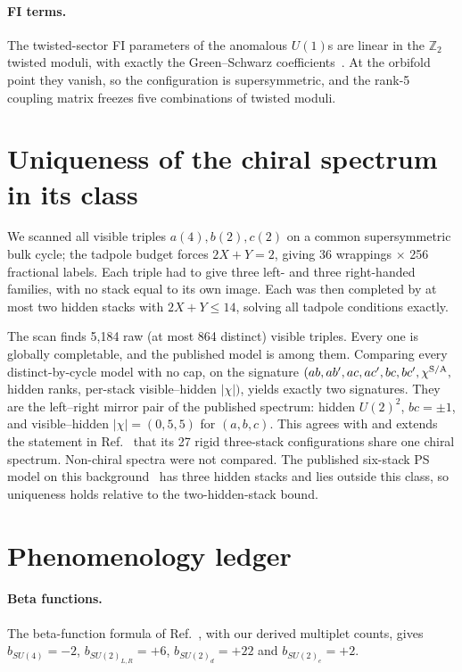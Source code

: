 \documentclass[aps,prd,twocolumn,superscriptaddress,nofootinbib,showkeys]{revtex4-2}
\begin{document}
\paragraph{FI terms.} The twisted-sector FI parameters of the anomalous $U(1)$s are linear in the $\mathbb Z_2$ twisted moduli, with exactly the Green--Schwarz coefficients~\cite{BCMS}. At the orbifold point they vanish, so the configuration is supersymmetric, and the rank-5 coupling matrix freezes five combinations of twisted moduli.

\section{Uniqueness of the chiral spectrum in its class}
We scanned all visible triples $a(4),b(2),c(2)$ on a common supersymmetric bulk cycle; the tadpole budget forces $2X+Y=2$, giving 36 wrappings $\times$ 256 fractional labels. Each triple had to give three left- and three right-handed families, with no stack equal to its own image. Each was then completed by at most two hidden stacks with $2X+Y\le14$, solving all tadpole conditions exactly.

The scan finds 5{,}184 raw (at most 864 distinct) visible triples. Every one is globally completable, and the published model is among them. Comparing every distinct-by-cycle model with no cap, on the signature $(ab,ab',ac,ac',bc,bc',\chi^{\rm S/A},$ hidden ranks, per-stack visible--hidden $|\chi|)$, yields exactly two signatures. They are the left--right mirror pair of the published spectrum: hidden $U(2)^2$, $bc=\pm1$, and visible--hidden $|\chi|=(0,5,5)$ for $(a,b,c)$. This agrees with and extends the statement in Ref.~\cite{HRS} that its 27 rigid three-stack configurations share one chiral spectrum. Non-chiral spectra were not compared. The published six-stack PS model on this background~\cite{HS13} has three hidden stacks and lies outside this class, so uniqueness holds relative to the two-hidden-stack bound.

\section{Phenomenology ledger}
\paragraph{Beta functions.} The beta-function formula of Ref.~\cite{HRS}, with our derived multiplet counts, gives $b_{SU(4)}=-2$, $b_{SU(2)_{L,R}}=+6$, $b_{SU(2)_d}=+22$ and $b_{SU(2)_e}=+2$.
\end{document}
